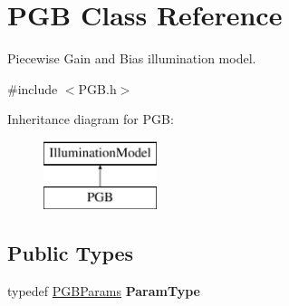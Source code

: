 \hypertarget{classPGB}{\section{P\-G\-B Class Reference}
\label{classPGB}
}


Piecewise Gain and Bias illumination model.  




{\ttfamily \#include $<$P\-G\-B.\-h$>$}

Inheritance diagram for P\-G\-B\-:\begin{figure}[H]
\begin{center}
\leavevmode
\includegraphics[height=2.000000cm]{classPGB}
\end{center}
\end{figure}
\subsection*{Public Types}
\begin{DoxyCompactItemize}
\item 
\hypertarget{classPGB_a5c3d6a1ab906a7f700331c5fe4ad6d03}{typedef \hyperlink{structPGBParams}{P\-G\-B\-Params} {\bfseries Param\-Type}}\label{classPGB_a5c3d6a1ab906a7f700331c5fe4ad6d03}

\end{DoxyCompactItemize}
